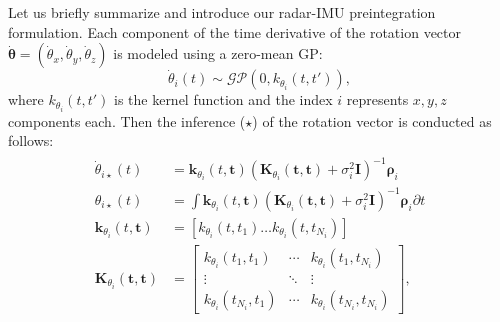 Let us briefly summarize \cite{le2021continuous} and introduce our radar-\ac{IMU} preintegration formulation.
%
%
Each component of the time derivative of the rotation vector $\dot{\boldsymbol{\theta}}=(\dot\theta_x, \dot\theta_y, \dot\theta_z)$ is modeled using a zero-mean \ac{GP}:
\vspace{-1mm}
\begin{equation}
    \dot\theta_i(t)\sim\mathcal{GP}(0,k_{\theta_i}(t,t')),
\end{equation}
where $k_{\theta_i}(t,t')$ is the kernel function and the index $i$ represents $x,y,z$ components each.
Then the inference ($\star$) of the rotation vector is conducted as follows:
\begin{eqnarray}
\begin{aligned}
\label{eqn:rot_derivative_inference}
    \dot{\theta}_{i\star}(t)&=\mathbf{k}_{\theta_i}(t,\mathbf{t})(\mathbf{K}_{\theta_i}(\mathbf{t}, \mathbf{t})+\sigma_i^2\mathbf{I})^{-1}\boldsymbol{\rho}_i \\
\label{eqn:rot_inference}
    \theta_{i\star}(t)&=\int\mathbf{k}_{\theta_i}(t,\mathbf{t})(\mathbf{K}_{\theta_i}(\mathbf{t}, \mathbf{t})+\sigma_i^2\mathbf{I})^{-1}\boldsymbol{\rho}_i \partial t \\
\label{eqn:kernel}
    \mathbf{k}_{\theta_i}(t,\mathbf{t})&=[k_{\theta_i}(t,t_1)\dots k_{\theta_i}(t,t_{N_i})] \\
    \mathbf{K}_{\theta_i}(\mathbf{t},\mathbf{t})&=
    \begin{bmatrix}
        k_{\theta_i}(t_1,t_1) & \cdots & k_{\theta_i}(t_1,t_{N_i}) \\
        \vdots & \ddots & \vdots \\
        k_{\theta_i}(t_{N_i},t_1) & \cdots & k_{\theta_i}(t_{N_i},t_{N_i})
    \end{bmatrix},
\end{aligned}
\end{eqnarray}
